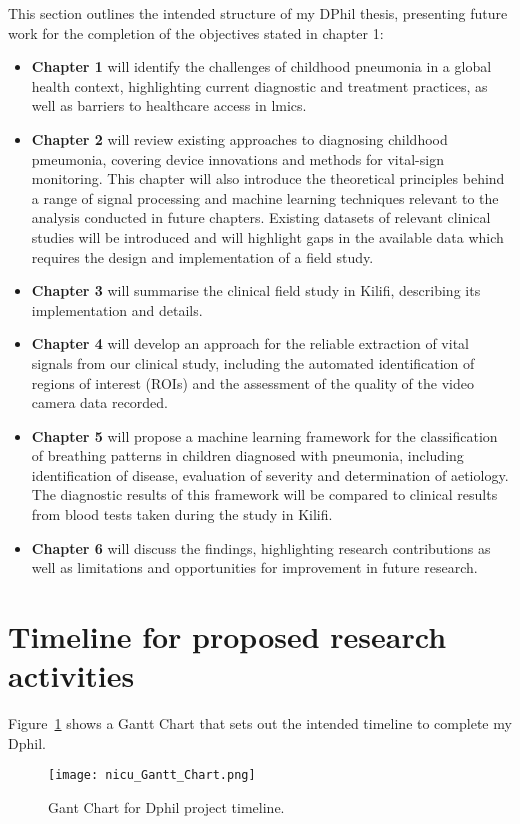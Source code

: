 This section outlines the intended structure of my DPhil thesis, presenting future work for the completion of the objectives stated in chapter 1:

\begin{itemize}

\item\textbf{ Chapter 1} will identify the challenges of childhood pneumonia in a global health context, highlighting current diagnostic and treatment practices, as well as barriers to healthcare access in \gls{lmic}s. 

\item\textbf{ Chapter 2} will review existing approaches to diagnosing childhood pmeumonia, covering device innovations and methods for vital-sign monitoring. This chapter will also introduce the theoretical principles behind a range of signal processing and machine learning techniques relevant to the analysis conducted in future chapters. Existing datasets of relevant clinical studies will be introduced and will highlight gaps in the available data which requires the design and implementation of a field study.

\item \textbf{Chapter 3} will summarise the clinical field study in Kilifi, describing its implementation and details.

\item \textbf{Chapter 4} will develop an approach for the reliable extraction of vital signals from our clinical study, including the automated identification of regions of interest (ROIs) and the assessment of the quality of the video camera data recorded.

\item \textbf{Chapter 5} will propose a machine learning framework for the classification of breathing patterns in children diagnosed with pneumonia, including identification of disease, evaluation of severity and determination of aetiology. The diagnostic results of this framework will be compared to clinical results from blood tests taken during the study in Kilifi.
 
\item \textbf{Chapter 6} will discuss the findings, highlighting research contributions as well as limitations and opportunities for improvement in future research.
\end{itemize}

\section{Timeline for proposed research activities}

Figure~\ref{gantchart} shows a Gantt Chart that sets out the intended timeline to complete my Dphil. 

\begin{figure}
    \centering
\texttt{[image: nicu\_Gantt\_Chart.png]}
 \caption[Gantt Chart for Dphil project timeline.]{Gant Chart for Dphil project timeline.}
     \label{gantchart}
\end{figure}
